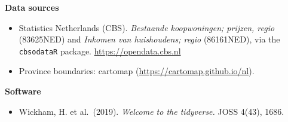 \documentclass[
]{article}
\providecommand{\tightlist}{%
  \setlength{\itemsep}{0pt}\setlength{\parskip}{0pt}}
\begin{document}
\textbf{Data sources}

\begin{itemize}
\tightlist
\item
  Statistics Netherlands (CBS). \emph{Bestaande koopwoningen; prijzen,
  regio} (83625NED) and \emph{Inkomen van huishoudens; regio}
  (86161NED), via the \texttt{cbsodataR} package.
  \url{https://opendata.cbs.nl}
\item
  Province boundaries: cartomap (\url{https://cartomap.github.io/nl}).
\end{itemize}

\textbf{Software}

\begin{itemize}
\tightlist
\item
  Wickham, H. et al.~(2019). \emph{Welcome to the tidyverse.} JOSS
  4(43), 1686.
\end{itemize}
\end{document}
